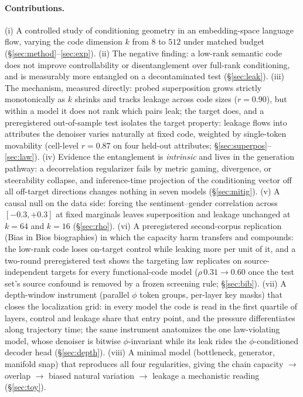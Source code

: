 \documentclass[11pt]{article}
\begin{document}
\paragraph{Contributions.}
(i) A controlled study of conditioning geometry in an embedding-space language flow,
varying the code dimension $k$ from $8$ to $512$ under matched budget
(\S\ref{sec:method}--\ref{sec:exp}).
(ii) The negative finding: a low-rank semantic code does not improve controllability
or disentanglement over full-rank conditioning, and is measurably more entangled on
a decontaminated test (\S\ref{sec:leak}).
(iii) The mechanism, measured directly: probed superposition grows strictly
monotonically as $k$ shrinks and tracks leakage across code sizes ($r{=}0.90$), but
within a model it does not rank which pairs leak; the target does, and a
preregistered out-of-sample test isolates the target property: leakage flows into
attributes the denoiser varies naturally at fixed code, weighted by single-token
movability (cell-level $r{=}0.87$ on four held-out attributes;
\S\ref{sec:superpos}--\ref{sec:law}).
(iv) Evidence the entanglement is \emph{intrinsic} and lives in the generation
pathway: a decorrelation regularizer fails by metric gaming, divergence, or
steerability collapse, and inference-time projection of the conditioning vector off
all off-target directions changes nothing in seven models (\S\ref{sec:mitig}).
(v) A causal null on the data side: forcing the sentiment--gender correlation across
$[-0.3,+0.3]$ at fixed marginals leaves superposition and leakage unchanged at
$k{=}64$ and $k{=}16$ (\S\ref{sec:rho}).
(vi) A preregistered second-corpus replication (Bias in Bios biographies) in
which the capacity harm transfers and compounds: the low-rank code loses
on-target control while leaking more per unit of it, and a two-round
preregistered test shows the targeting law replicates on source-independent
targets for every functional-code model ($\rho\,0.31\!\to\!0.60$ once the
test set's source confound is removed by a frozen screening rule;
\S\ref{sec:bib}).
(vii) A depth-window instrument (parallel $\phi$ token groups, per-layer key
masks) that closes the localization grid: in every model the code is read in
the first quartile of layers, control and leakage share that entry point,
and the pressure differentiates along trajectory time; the same instrument
anatomizes the one law-violating model, whose denoiser is bitwise
$\phi$-invariant while its leak rides the $\phi$-conditioned decoder head
(\S\ref{sec:depth}).
(viii) A minimal model (bottleneck, generator, manifold snap) that reproduces all
four regularities, giving the chain capacity $\to$ overlap $\to$ biased natural
variation $\to$ leakage a mechanistic reading (\S\ref{sec:toy}).
\end{document}
